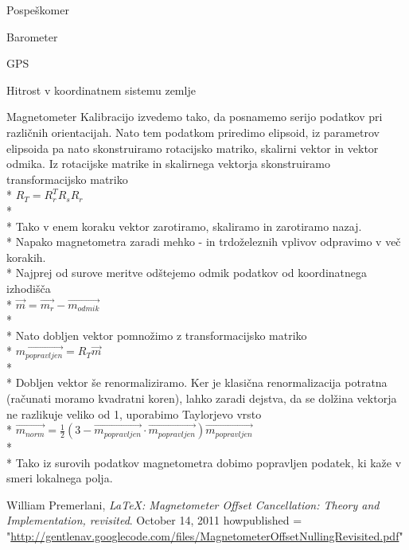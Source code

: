 \documentclass[]{article}
\begin{document}
\begin {subsection}{Pospeškomer}
\begin {subsection}{Barometer}
\begin {subsection}{GPS}
\begin {subsection}{Hitrost v koordinatnem sistemu zemlje}
\begin {subsection}{Magnetometer}
Kalibracijo izvedemo tako, da posnamemo serijo podatkov pri različnih orientacijah. Nato tem podatkom priredimo elipsoid, iz parametrov elipsoida pa nato skonstruiramo rotacijsko matriko, skalirni vektor in vektor odmika.
Iz rotacijske matrike in skalirnega vektorja skonstruiramo transformacijsko matriko\\*
$ R_{T} = R^{T}_{r}  R_{s}  R_{r} $\\*\\*
Tako v enem koraku vektor zarotiramo, skaliramo in zarotiramo nazaj.\\*
Napako magnetometra zaradi mehko - in trdoželeznih vplivov odpravimo v več korakih.\\*
Najprej od surove meritve odštejemo odmik podatkov od koordinatnega izhodišča\\*
$ \vec{m} = \vec{m_{r}} - \vec{m_{odmik}}  $\\*\\*
Nato dobljen vektor pomnožimo z transformacijsko matriko\\*
$ \vec{m_{popravljen}} = R_{T} \vec{m} $\\*\\*
Dobljen vektor še renormaliziramo. Ker je klasična renormalizacija potratna (računati moramo kvadratni koren), lahko zaradi dejstva, da se dolžina vektorja ne razlikuje veliko od 1, uporabimo Taylorjevo vrsto\\*
$ \vec{m_{norm}} = \frac{1}{2}(3 - \vec{m_{popravljen}} \cdot \vec{m_{popravljen}} )\vec{m_{popravljen}} $\\*\\*
Tako iz surovih podatkov magnetometra dobimo popravljen podatek, ki kaže v smeri lokalnega polja.

\end {subsection}

\end{subsection}
\end{subsection}
\end{subsection}
\end{subsection}

\begin{bibliography}{9}

  William Premerlani,
  \emph{\LaTeX: Magnetometer Offset Cancellation: Theory and Implementation, revisited}.
  October 14, 2011
  howpublished = "\url{http://gentlenav.googlecode.com/files/MagnetometerOffsetNullingRevisited.pdf}"


\end{bibliography}
\end{document}
